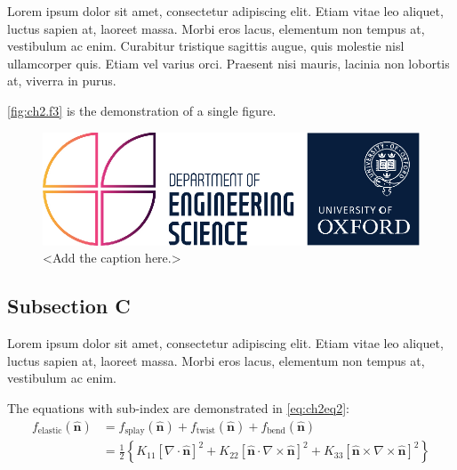     \par\noindent Lorem ipsum dolor sit amet, consectetur adipiscing elit. Etiam vitae leo aliquet, luctus sapien at, laoreet massa. Morbi eros lacus, elementum non tempus at, vestibulum ac enim. Curabitur tristique sagittis augue, quis molestie nisl ullamcorper quis. Etiam vel varius orci. Praesent nisi mauris, lacinia non lobortis at, viverra in purus. 
    \par\noindent \autoref{fig:ch2.f3} is the demonstration of a single figure.
    \par\begin{minipage}{\linewidth}
        \centering
        \begin{figure}[H]
            \centering    
            \includegraphics[width=0.55\linewidth]{Images/CH2/EngLogo_PlaceHolder}
            \caption{<Add the caption here.>}\label{fig:ch2.f3}
        \end{figure}
    \end{minipage}%
    \par\subsection{Subsection C}\label{sec:ch2.sec1.subsec3}
    Lorem ipsum dolor sit amet, consectetur adipiscing elit. Etiam vitae leo aliquet, luctus sapien at, laoreet massa. Morbi eros lacus, elementum non tempus at, vestibulum ac enim. 
    \par\noindent The equations with sub-index are demonstrated in \autoref{eq:ch2eq2}:
    \begin{subequations}
        \begin{align}
            f_{\text{elastic}}(\widehat{\mathbf{n}})&=f_{\text{splay}}(\widehat{\mathbf{n}})+f_{\text{twist}}(\widehat{\mathbf{n}})+f_{\text{bend}}(\widehat{\mathbf{n}})\\
            &=\frac{1}{2}\left\{K_{11}{\left[\nabla\cdot\widehat{\mathbf{n}}\right]}^{2}+K_{22}{\left[\widehat{\mathbf{n}}\cdot\nabla\times\widehat{\mathbf{n}}\right]}^{2}+K_{33}{\left[\widehat{\mathbf{n}}\times\nabla\times\widehat{\mathbf{n}}\right]}^{2}\right\}\label{eq:ch2eq2}
        \end{align}
    \end{subequations}
